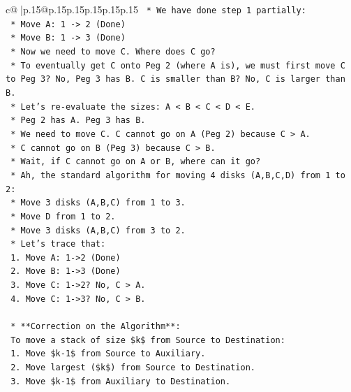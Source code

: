\documentclass{article}
\begin{document}
{\begin{supertabular}{c@{$\;$}|p{.15\linewidth}@{}p{.15\linewidth}p{.15\linewidth}p{.15\linewidth}p{.15\linewidth}p{.15\linewidth}}
{{{\texttt{    *   We have done step 1 partially:} \\
\texttt{        *   Move A: 1 {-}> 2 (Done)} \\
\texttt{        *   Move B: 1 {-}> 3 (Done)} \\
\texttt{        *   Now we need to move C. Where does C go?} \\
\texttt{        *   To eventually get C onto Peg 2 (where A is), we must first move C to Peg 3? No, Peg 3 has B. C is smaller than B? No, C is larger than B.} \\
\texttt{        *   Let's re{-}evaluate the sizes: A < B < C < D < E.} \\
\texttt{        *   Peg 2 has A. Peg 3 has B.} \\
\texttt{        *   We need to move C. C cannot go on A (Peg 2) because C > A.} \\
\texttt{        *   C cannot go on B (Peg 3) because C > B.} \\
\texttt{        *   Wait, if C cannot go on A or B, where can it go?} \\
\texttt{        *   Ah, the standard algorithm for moving 4 disks (A,B,C,D) from 1 to 2:} \\
\texttt{            *   Move 3 disks (A,B,C) from 1 to 3.} \\
\texttt{            *   Move D from 1 to 2.} \\
\texttt{            *   Move 3 disks (A,B,C) from 3 to 2.} \\
\texttt{        *   Let's trace that:} \\
\texttt{            1.  Move A: 1{-}>2 (Done)} \\
\texttt{            2.  Move B: 1{-}>3 (Done)} \\
\texttt{            3.  Move C: 1{-}>2? No, C > A.} \\
\texttt{            4.  Move C: 1{-}>3? No, C > B.} \\
\\ 
\texttt{    *   **Correction on the Algorithm**:} \\
\texttt{        To move a stack of size \$k\$ from Source to Destination:} \\
\texttt{        1. Move \$k{-}1\$ from Source to Auxiliary.} \\
\texttt{        2. Move largest (\$k\$) from Source to Destination.} \\
\texttt{        3. Move \$k{-}1\$ from Auxiliary to Destination.} \\
\\ 
}}}
\end{supertabular}}
\end{document}

